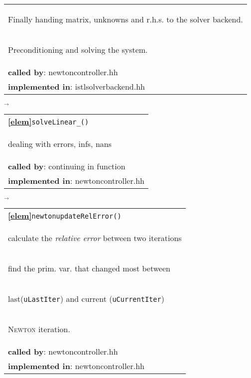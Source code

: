 \begin{landscape}
{\begin{tabular}{|l|}
      \begin{scriptsize}Finally handing matrix, unknowns and r.h.s. to the solver backend.\end{scriptsize}\\
      \begin{scriptsize}Preconditioning and solving the system. \end{scriptsize}\\
      \textbf{called by}: newtoncontroller.hh\\ 
      \textbf{implemented in}: istlsolverbackend.hh\\ 
	\hline 
  \end{tabular}
    {\scriptsize$\overrightarrow{}
    $}
   \begin{tabular}{|l|} 
      \hline 
      \textbf{\textcircled{\ref{elem}}}\verb+solveLinear_()+\\ 
      \begin{scriptsize}dealing with errors, infs, nans \end{scriptsize}\\
      \textbf{called by}: continuing in function\\ 
      \textbf{implemented in}: newtoncontroller.hh\\ 
	\hline 
  \end{tabular}
\nextline
    {\scriptsize$\overrightarrow{}
    $}
   \begin{tabular}{|l|} 
      \hline 
      \textbf{\textcircled{\ref{elem}}}\verb+newtonupdateRelError()+\\ 
      \begin{scriptsize}calculate the \emph{relative error} between two iterations\end{scriptsize}\\
      \begin{scriptsize}\quad find the prim. var. that changed most between \end{scriptsize}\\
      \begin{scriptsize}\quad last(\verb+uLastIter+) and current (\verb+uCurrentIter+) \end{scriptsize}\\
      \begin{scriptsize}\quad \textsc{Newton} iteration.\end{scriptsize}\\
      \textbf{called by}: newtoncontroller.hh\\ 
      \textbf{implemented in}: newtoncontroller.hh\\ 

\end{tabular}}
\end{landscape}
